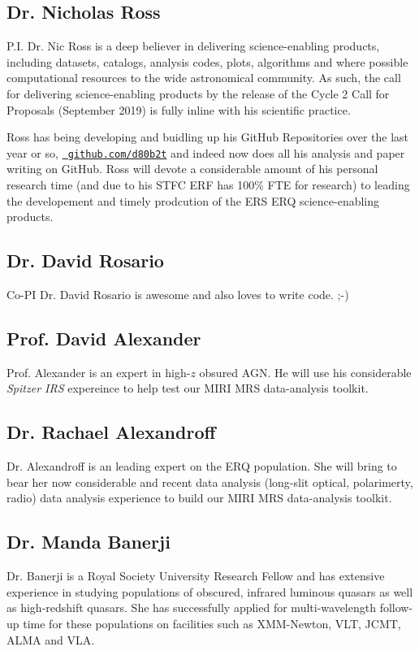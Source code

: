 \subsection*{Dr. Nicholas Ross}
P.I. Dr. Nic Ross is a deep believer in delivering science-enabling
products, including datasets, catalogs, analysis codes, plots,
algorithms and where possible computational resources to the wide
astronomical community.  As such, the call for delivering
science-enabling products by the release of the Cycle 2 Call for
Proposals (September 2019) is fully inline with his scientific
practice.

\smallskip \smallskip
\noindent
Ross has being developing and buidling up his GitHub Repositories over
the last year or so, \href{https://github.com/d80b2t}{\tt
github.com/d80b2t} and indeed now does all his analysis and paper
writing on GitHub.
Ross will devote a considerable amount of his personal research time
(and due to his STFC ERF has 100\% FTE for research) to leading the
developement and timely prodcution of the ERS ERQ science-enabling
products.


\subsection*{Dr. David Rosario} 
Co-PI Dr. David Rosario is awesome and also loves to write code. ;-)


\subsection*{Prof. David Alexander} 
Prof. Alexander is an expert in high-$z$ obsured AGN.  He will use his
considerable {\it Spitzer IRS} expereince to help test our MIRI MRS
data-analysis toolkit.


\subsection*{Dr. Rachael Alexandroff} 
Dr. Alexandroff is an leading expert on the ERQ population.  She will
bring to bear her now considerable and recent data analysis (long-slit
optical, polarimerty, radio) data analysis experience to build our
MIRI MRS data-analysis toolkit.


\subsection*{Dr. Manda Banerji}
Dr. Banerji is a Royal Society University Research Fellow and has
extensive experience in studying populations of obscured, infrared
luminous quasars as well as high-redshift quasars. She has
successfully applied for multi-wavelength follow-up time for these
populations on facilities such as XMM-Newton, VLT, JCMT, ALMA and
VLA.


